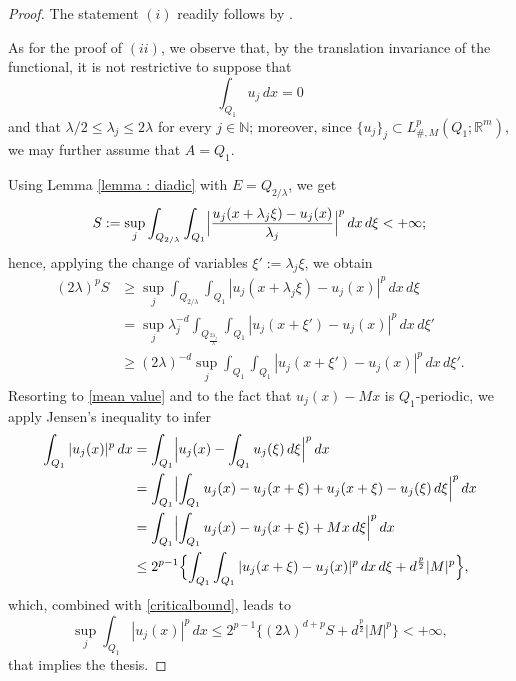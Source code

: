 \documentclass{article}
\theoremstyle{definition}
\newcommand{\N}{\mathbb{N}}
\newcommand{\R}{\mathbb{R}}
\begin{document}
\begin{proof}
    The statement $(i)$ readily follows by \cite[Corollary $4.2$]{AABPT}.

    As for the proof of $(ii)$, we observe that, by the translation invariance of the functional, it is not restrictive to suppose that
    \begin{equation}\label{mean value}
        \int_{Q_1} u_j\,dx=0
    \end{equation}
    and that $\lambda/2\leq\lambda_j\leq 2\lambda$ for every $j\in\N$; moreover, since $\{u_j\}_j\subset L^p_{\#,M}(Q_1;\R^m)$, we may further assume that $A=Q_1$.

Using Lemma \ref{lemma : diadic} with $E=Q_{2/\lambda}$, we get 
\begin{equation*}
    S:=\sup_j\int_{Q_{2/\lambda}} \int_{Q_1} \Bigl|\frac{u_j(x+\lambda_j\xi)-u_j(x)}{\lambda_j}\Bigr|^p\, dx\,d\xi <+\infty;
\end{equation*}
hence, applying the change of variables $\xi':=\lambda_j\xi$, we obtain
\begin{align} \nonumber
    (2\lambda)^pS & \geq \sup_j \int_{Q_{2/\lambda}} \int_{Q_1} |u_j(x+\lambda_j\xi)-u_j(x)|^p\, dx\,d\xi \\ \nonumber
    & = \sup_j \lambda_j^{-d}\int_{Q_{\frac{2\lambda_j}{\lambda}}} \int_{Q_1} |u_j(x+\xi')-u_j(x)|^p\, dx\,d\xi' \\ \label{criticalbound}
    & \geq (2\lambda)^{-d} \sup_j \int_{Q_1} \int_{Q_1} |u_j(x+\xi')-u_j(x)|^p\, dx\,d\xi'.
\end{align}
Resorting to \eqref{mean value} and to the fact that $u_j(x)-Mx$ is $Q_1$-periodic, we apply Jensen's inequality to infer
\begin{align*}
    \int_{Q_1} |u_j(x)|^p\,dx & = \int_{Q_1} \Bigl|u_j(x)-\int_{Q_1}u_j(\xi)\, d\xi\Bigr|^p\,dx \\
    & = \int_{Q_1} \Bigl|\int_{Q_1}u_j(x)-u_j(x+\xi)+u_j(x+\xi)-u_j(\xi)\, d\xi\Bigr|^p\,dx \\
& = \int_{Q_1} \Bigl|\int_{Q_1}u_j(x)-u_j(x+\xi)+Mx\, d\xi\Bigr|^p\,dx \\
& \leq 2^{p-1} \Bigl\{\int_{Q_1}\int_{Q_1}|u_j(x+\xi)-u_j(x)|^p\, dx\, d\xi + d^{\frac{p}{2}}|M|^p\Bigr\},
\end{align*}
which, combined with \eqref{criticalbound}, leads to
\begin{equation*}
    \sup_j \int_{Q_1} |u_j(x)|^p\,dx \leq 2^{p-1}\{(2\lambda)^{d+p}S+d^{\frac{p}{2}}|M|^p\}<+\infty,
\end{equation*}
that implies the thesis.
\end{proof}
\end{document}
